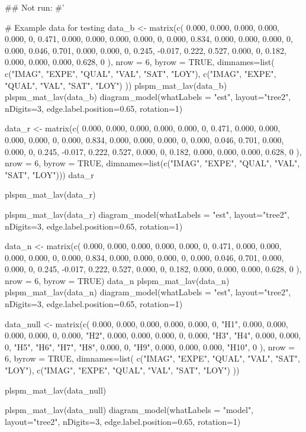 \documentclass[a4paper]{book}
\begin{document}
\begin{Examples}
\begin{ExampleCode}

\#\# Not run: 
#'

# Example data for testing
data_b <- matrix(c(
  0.000, 0.000, 0.000, 0.000, 0.000, 0,
  0.471, 0.000, 0.000, 0.000, 0.000, 0,
  0.000, 0.834, 0.000, 0.000, 0.000, 0,
  0.000, 0.046, 0.701, 0.000, 0.000, 0,
  0.245, -0.017, 0.222, 0.527, 0.000, 0,
  0.182, 0.000, 0.000, 0.000, 0.628, 0
), nrow = 6, byrow = TRUE,
dimnames=list(
  c("IMAG", "EXPE", "QUAL", "VAL", "SAT", "LOY"),
  c("IMAG", "EXPE", "QUAL", "VAL", "SAT", "LOY")
))
plspm_mat_lav(data_b)%
plspm_mat_lav(data_b)%
  diagram_model(whatLabels = "est", layout="tree2", nDigits=3,
                edge.label.position=0.65, rotation=1)


data_r <- matrix(c(
  0.000, 0.000, 0.000, 0.000, 0.000, 0,
  0.471, 0.000, 0.000, 0.000, 0.000, 0,
  0.000, 0.834, 0.000, 0.000, 0.000, 0,
  0.000, 0.046, 0.701, 0.000, 0.000, 0,
  0.245, -0.017, 0.222, 0.527, 0.000, 0,
  0.182, 0.000, 0.000, 0.000, 0.628, 0
), nrow = 6, byrow = TRUE,
dimnames=list(c("IMAG", "EXPE", "QUAL", "VAL", "SAT", "LOY")))
data_r

plspm_mat_lav(data_r)%

plspm_mat_lav(data_r)%
  diagram_model(whatLabels = "est", layout="tree2", nDigits=3,
                edge.label.position=0.65, rotation=1)

data_n <- matrix(c(
  0.000, 0.000, 0.000, 0.000, 0.000, 0,
  0.471, 0.000, 0.000, 0.000, 0.000, 0,
  0.000, 0.834, 0.000, 0.000, 0.000, 0,
  0.000, 0.046, 0.701, 0.000, 0.000, 0,
  0.245, -0.017, 0.222, 0.527, 0.000, 0,
  0.182, 0.000, 0.000, 0.000, 0.628, 0
), nrow = 6, byrow = TRUE)
data_n
plspm_mat_lav(data_n)%
plspm_mat_lav(data_n)%
  diagram_model(whatLabels = "est", layout="tree2", nDigits=3,
                edge.label.position=0.65, rotation=1)



data_null <- matrix(c(
  0.000, 0.000, 0.000, 0.000, 0.000, 0,
  "H1", 0.000, 0.000, 0.000, 0.000, 0,
  0.000, "H2", 0.000, 0.000, 0.000, 0,
  0.000, "H3", "H4", 0.000, 0.000, 0,
  "H5", "H6", "H7", "H8", 0.000, 0,
  "H9", 0.000, 0.000, 0.000, "H10", 0
), nrow = 6, byrow = TRUE,
dimnames=list(
  c("IMAG", "EXPE", "QUAL", "VAL", "SAT", "LOY"),
  c("IMAG", "EXPE", "QUAL", "VAL", "SAT", "LOY")
))

plspm_mat_lav(data_null)%

plspm_mat_lav(data_null)%
  diagram_model(whatLabels = "model", layout="tree2", nDigits=3,
                edge.label.position=0.65, rotation=1)


\end{ExampleCode}
\end{Examples}
\end{document}
